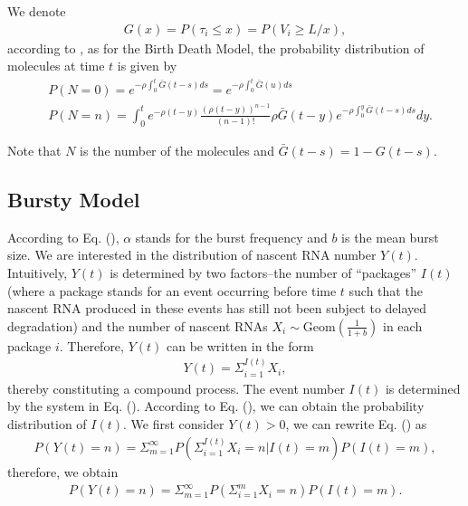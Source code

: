\documentclass[a4paper,10pt]{article}
\begin{document}
We denote
\begin{equation}
	\begin{aligned}
		G(x)=P(\tau_i\leq x)=P(V_i\geq L/x),
	\end{aligned}
\end{equation}
according to \cite{ross2014introduction}, as for the Birth Death Model, the probability distribution of molecules at time $t$ is given by
\begin{equation}
	\begin{aligned}\label{variable tau}
		&P(N=0)=e^{-\rho\int^t_0\bar{G}(t-s)ds}=e^{-\rho\int^t_0\bar{G}(u)ds} \\
		&P(N=n)=\int_0^t e^{-\rho(t-y)} \frac{(\rho(t-y))^{n-1}}{(n-1) !} \rho\bar{G}(t-y) e^{-\rho \int_0^y \bar{G}(t-s) d s} dy.
	\end{aligned}
\end{equation}

Note that $N$ is the number of the molecules and $\bar{G}(t-s)=1-G(t-s)$.
\subsection{Bursty Model}
According to Eq. (), $\alpha$ stands for the burst frequency and $b$ is the mean burst size. We are interested in the distribution of nascent RNA number $Y(t)$. Intuitively, $Y(t)$ is determined by two factors--the number of “packages” $I(t)$ (where a package stands for an event occurring before time $t$ such that the
nascent RNA produced in these events has still not been subject to delayed degradation) and the number
of nascent RNAs $X_i\sim\text{Geom}(\frac{1}{1+b})$ in each package $i$. Therefore, $Y(t)$ can be written in the form
\begin{equation}
	\begin{aligned}\label{Y(t)}
		Y(t)=\Sigma_{i=1}^{I(t)} X_i,
	\end{aligned}
\end{equation}
thereby constituting a compound process. The event number $I(t)$ is determined by the system in Eq. (). According to Eq. (), we can obtain the probability distribution of $I(t)$. We first consider $Y(t)>0$, we can rewrite Eq. () as
\begin{equation}
	\begin{aligned}
	P(Y(t)=n)=\Sigma_{m=1}^\infty P(\Sigma_{i=1}^{I(t)}X_i=n|I(t)=m)P(I(t)=m),
	\end{aligned}
\end{equation}
therefore, we obtain
\begin{equation}\label{Y(t)2}
	\begin{aligned}
	P(Y(t)=n)=\Sigma_{m=1}^\infty P(\Sigma_{i=1}^m X_i=n)P(I(t)=m).
	\end{aligned}
\end{equation}
\end{document}
